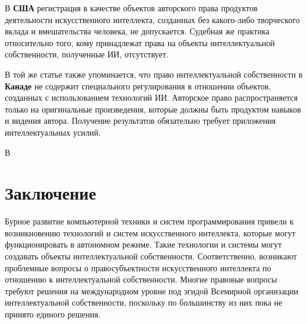 В \textbf{США} регистрация в качестве объектов авторского права продуктов деятельности
искусственного интеллекта, созданных без какого-либо творческого вклада и вмешательства человека, не
допускается. Судебная же практика относительно того, кому принадлежат права на объекты интеллектуальной
собственности, полученные ИИ, отсутствует.

В той же статье \cite{abr} также упоминается, что право интеллектуальной собственности в \textbf{Канаде}
не содержит специального регулирования в отношении объектов, созданных с использованием технологий
ИИ. Авторское право распространяется только на оригинальные произведения, которые должны быть
продуктом навыков и видения автора. Получение результатов обязательно требует приложения интеллектуальных
усилий.

В

\newpage

\section{Заключение}
Бурное развитие компьютерной техники и систем программирования привели к возникновению технологий и
систем искусственного интеллекта, которые могут функционировать в автономном режиме. Такие технологии
и системы могут создавать объекты интеллектуальной собственности. Соответственно, возникают проблемные
вопросы о правосубъектности искусственного интеллекта по отношению к интеллектуальной собственности.
Многие правовые вопросы требуют решения на международном уровне под эгидой Всемирной организации интеллектуальной
собственности, поскольку по большинству из них пока не принято единого решения.
\newpage

